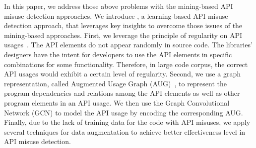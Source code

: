 
In this paper, we address those above problems with the mining-based
API misuse detection approaches. We introduce {\tool}, a
learning-based API misuse detection approach, that leverages key
insights to overcome those issues of the mining-based approaches.
First, we leverage the principle of regularity on API
usages~\cite{NNP+09}. The API elements do not appear randomly in
source code. The libraries' designers have the intent for developers
to use the API elements in specific combinations for some
functionality. Therefore, in large code corpus, the correct API usages
would exhibit a certain level of regularity.
Second, we use a graph representation, called Augmented Usage Graph
(AUG)~\cite{mudetect-msr19}, to represent the program dependencies and
relations among the API elements as well as other program elements in
an API usage. We then use the Graph Convolutional Network (GCN) to
model the API usage by encoding the corresponding AUG. Finally, due to
the lack of training data for the code with API misuses, we apply
several techniques for data augmentation to achieve better
effectiveness level in API misuse detection.


